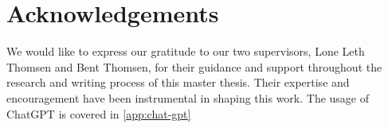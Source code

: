 \section*{Acknowledgements}

We would like to express our gratitude to our two supervisors, Lone Leth Thomsen and Bent Thomsen, for their guidance and support throughout the research and writing process of this master thesis. Their expertise and encouragement have been instrumental in shaping this work. The usage of ChatGPT is covered in \cref{app:chat-gpt}